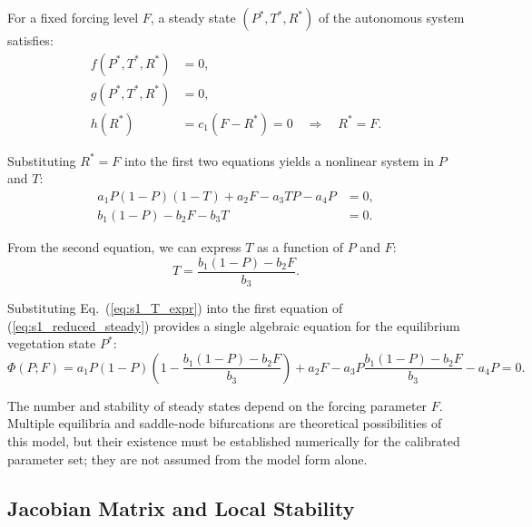 \documentclass[12pt,a4paper]{article}
\begin{document}
For a fixed forcing level $F$, a steady state $(P^*, T^*, R^*)$ of the autonomous system satisfies:
\begin{equation}
	\begin{aligned}
		f(P^*, T^*, R^*) &= 0, \\
		g(P^*, T^*, R^*) &= 0, \\
		h(R^*) &= c_1(F - R^*) = 0 \quad \Rightarrow \quad R^* = F.
	\end{aligned}
	\label{eq:s1_steady}
\end{equation}

Substituting $R^*=F$ into the first two equations yields a nonlinear system in $P$ and $T$:
\begin{equation}
	\begin{aligned}
		a_1P(1-P)(1-T) + a_2F - a_3TP - a_4P &= 0, \\
		b_1(1-P) - b_2F - b_3T &= 0.
	\end{aligned}
	\label{eq:s1_reduced_steady}
\end{equation}

From the second equation, we can express $T$ as a function of $P$ and $F$:
\begin{equation}
	T = \frac{b_1(1-P) - b_2F}{b_3}.
	\label{eq:s1_T_expr}
\end{equation}

Substituting Eq.~(\ref{eq:s1_T_expr}) into the first equation of (\ref{eq:s1_reduced_steady}) provides a single algebraic equation for the equilibrium vegetation state $P^*$:
\begin{equation}
	\Phi(P; F) = a_1P(1-P)\left(1 - \frac{b_1(1-P) - b_2F}{b_3}\right) + a_2F - a_3P\frac{b_1(1-P) - b_2F}{b_3} - a_4P = 0.
	\label{eq:s1_bifurcation_eq}
\end{equation}

The number and stability of steady states depend on the forcing parameter $F$. Multiple equilibria and saddle-node bifurcations are theoretical possibilities of this model, but their existence must be established numerically for the calibrated parameter set; they are not assumed from the model form alone.

\subsection{Jacobian Matrix and Local Stability}
\end{document}
